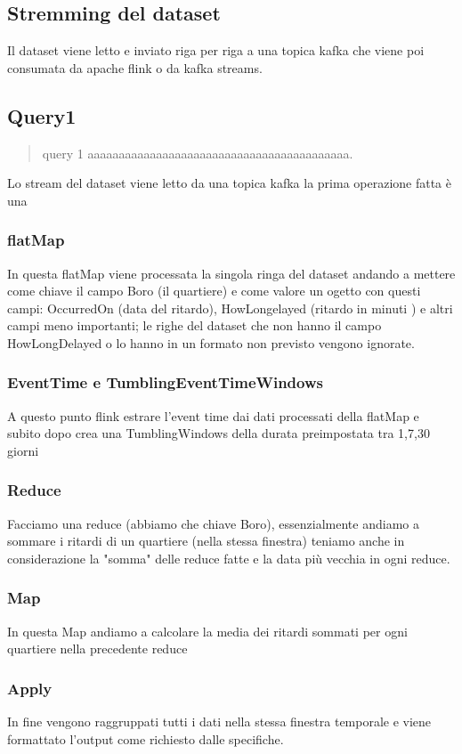 \documentclass[acmsmall]{acmart}
\begin{document}
\subsection{Stremming del dataset}
Il dataset viene letto e inviato riga per riga a una topica kafka che viene poi consumata da apache flink o da kafka streams.

\subsection{Query1}
\begin{quote}
query 1
aaaaaaaaaaaaaaaaaaaaaaaaaaaaaaaaaaaaaaaaaa.\end{quote}

Lo stream del dataset viene letto da una topica kafka la prima operazione fatta 
è una 
\subsubsection{flatMap} 
In questa flatMap viene processata la singola ringa del dataset andando a mettere come chiave il campo Boro (il quartiere) e come valore un ogetto con questi campi: OccurredOn (data del ritardo), HowLongelayed (ritardo in minuti ) e altri campi meno importanti;
le righe del dataset che non hanno il campo HowLongDelayed o lo hanno in un formato non previsto vengono ignorate.
\subsubsection{EventTime e TumblingEventTimeWindows}
A questo punto flink estrare l'event time dai dati processati della flatMap e 
subito dopo crea una TumblingWindows della durata preimpostata tra 1,7,30 giorni

\subsubsection{Reduce}
Facciamo una reduce (abbiamo che chiave Boro), essenzialmente andiamo a sommare i ritardi di un quartiere (nella stessa finestra) 
teniamo anche in considerazione la "somma" delle reduce fatte e la data più vecchia in ogni reduce.

\subsubsection{Map}
In questa Map andiamo a calcolare la media dei ritardi sommati per ogni quartiere nella precedente reduce

\subsubsection{Apply}
In fine vengono raggruppati tutti i dati nella stessa finestra temporale e viene formattato l'output come richiesto dalle specifiche.
\end{document}

